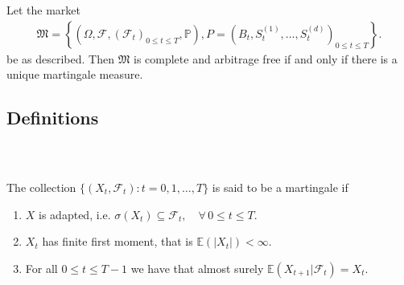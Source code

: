 \documentclass{beamer}
\numberwithin{equation}{section}
\begin{document}
\begin{frame}\frametitle{{\normalsize \secname} \\ {\large \subsecname}}
    \begin{theorem}
        Let the market 
        \begin{align*}
            \mathfrak{M} = \left\{ (\Omega, \mathscr{F}, (\mathscr{F}_t)_{0 \leq t \leq T}, \mathbb{P}), P = \left(B_t, S_t^{(1)}, \ldots, S_t^{(d)}\right)_{0 \leq t \leq T} \right\}. 
        \end{align*} 
        be as described. 
        Then $\mathfrak{M}$ is complete and arbitrage free if and only if there is a unique martingale measure.
    \end{theorem}
\end{frame}

\subsection{Definitions}

\begin{frame}\frametitle{{\normalsize \secname} \\ {\large \subsecname}}
    \begin{definition}[Martingale]
        The collection $\{ (X_t, \mathscr{F}_t): t = 0,1, \ldots, T \}$ is said to be a martingale if
        \begin{enumerate}
            \item $X$ is adapted, i.e. $\sigma(X_t) \subseteq \mathscr{F}_t, \quad \forall \, 0 \leq t \leq T$.
            \item $X_t$ has finite first moment, that is $\mathbb{E}(|X_t|) < \infty$. 
            \item For all $0 \leq t \leq T-1$ we have that almost surely $\mathbb{E}(X_{t + 1} | \mathscr{F}_t) = X_t$. 
        \end{enumerate}
    \end{definition}
\end{frame}
\end{document}
